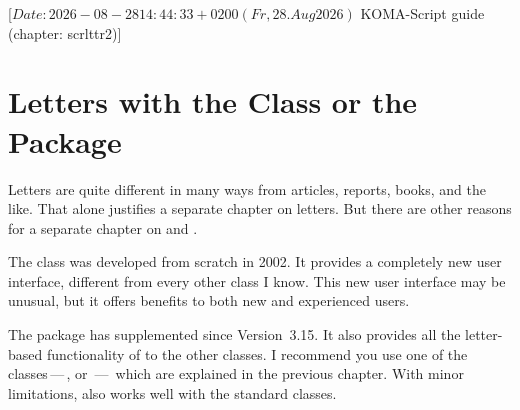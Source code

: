 %
%
%
%
%
%
%

%
                 [$Date: 2026-08-28 14:44:33 +0200 (Fr, 28. Aug 2026) $
                  KOMA-Script guide (chapter: scrlttr2)]


\chapter{Letters with the  Class or the 
  Package}

\BeginIndexGroup
{}%
%
Letters are quite different in many ways from articles, reports, books, and
the like. That alone justifies a separate chapter on letters. But there are
other reasons for a separate chapter on  and
.

The  class was developed from
scratch in 2002. It provides a completely new user interface, different from
every other class I know. This new user interface may be unusual, but it
offers benefits to both new and experienced {\KOMAScript} users.

The %
 package has supplemented \KOMAScript{}
since Version~3.15. It also provides all the letter-based functionality of
 to the other classes. I recommend you use one of the
\KOMAScript{} classes\,---\,,  or
\,---\, which are explained in the previous chapter. With
minor limitations,  also works well with the standard
classes.

